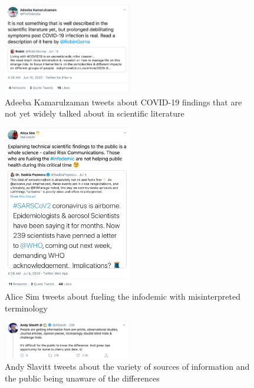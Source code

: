 \documentclass[acmsmall,authordraft]{acmart}
\begin{document}
\begin{figure}
  \includegraphics[width=0.5\textwidth]{Pictures/Appendix_Tweets/adeeba kamarulzaman tweet.png}
  \caption{Adeeba Kamarulzaman tweets about COVID-19 findings that are not yet widely talked about in scientific literature}
  \label{adeeba_kamarulzaman_tweet}
\end{figure}

\begin{figure}
  \includegraphics[width=0.5\textwidth]{Pictures/Appendix_Tweets/alice sim tweet.png}
  \caption{Alice Sim tweets about fueling the infodemic with misinterpreted terminology}
  \label{alice_sim_tweet}
\end{figure}

\begin{figure}
  \includegraphics[width=0.5\textwidth]{Pictures/Appendix_Tweets/andy slavitt tweet.png}
  \caption{Andy Slavitt tweets about the variety of sources of information and the public being unaware of the differences}
  \label{andy_slavitt_tweet}
\end{figure}
\end{document}
